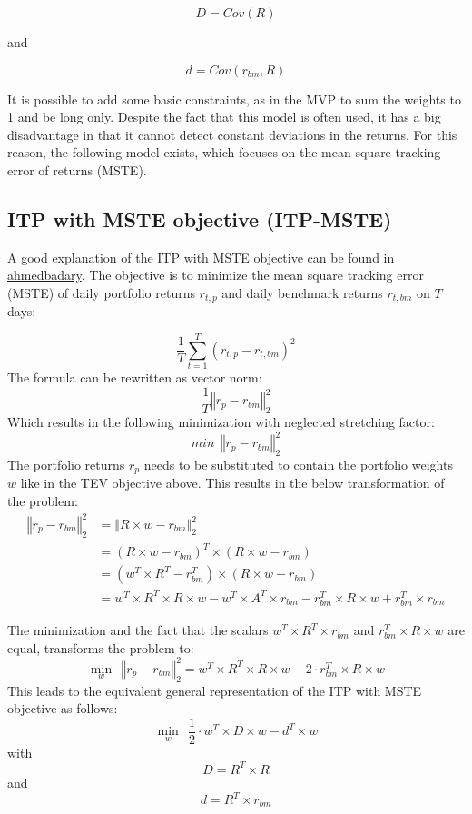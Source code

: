 \documentclass[
  oneside]{book}
\begin{document}
\[
  D = Cov(R)
\]

and

\[
d = Cov(r_{bm}, R)
\]

It is possible to add some basic constraints, as in the MVP to sum the weights to 1 and be long only. Despite the fact that this model is often used, it has a big disadvantage in that it cannot detect constant deviations in the returns. For this reason, the following model exists, which focuses on the mean square tracking error of returns (MSTE).

\hypertarget{itp-with-mste-objective-itp-mste}{%
\subsection{ITP with MSTE objective (ITP-MSTE)}\label{itp-with-mste-objective-itp-mste}}

A good explanation of the ITP with MSTE objective can be found in \href{https://ahmedbadary.github.io/work_files/research/conv_opt/hw/iftp}{ahmedbadary}. The objective is to minimize the mean square tracking error (MSTE) of daily portfolio returns \(r_{t, p}\) and daily benchmark returns \(r_{t, bm}\) on \(T\) days:

\[
  \frac{1}{T} \sum^T_{t=1}(r_{t, p}-r_{t, bm})^2
\]
The formula can be rewritten as vector norm:
\[
  \frac{1}{T} \left\Vert r_{p}-r_{bm} \right\Vert_2^2
\]
Which results in the following minimization with neglected stretching factor:
\[
 min \ \  \left\Vert r_{p}-r_{bm} \right\Vert_2^2
\]
The portfolio returns \(r_p\) needs to be substituted to contain the portfolio weights \(w\) like in the TEV objective above. This results in the below transformation of the problem:
\begin{align*}
  \left\Vert r_{p}-r_{bm} \right\Vert_2^2 &= \left\Vert R \times w-r_{bm} \right\Vert_2^2 \\ 
  &= (R \times w-r_{bm})^T \times (R \times w-r_{bm}) \\ 
  &= (w^T \times R^T-r_{bm}^T) \times (R \times w-r_{bm}) \\ 
  &= w^T \times R^T \times R \times w - w^T \times A^T \times r_{bm} - r_{bm}^T \times R \times w + r_{bm}^T \times r_{bm} 
\end{align*}

The minimization and the fact that the scalars \(w^T \times R^T \times r_{bm}\) and \(r_{bm}^T \times R \times w\) are equal, transforms the problem to:
\[
  \min\limits_{w} \ \  \left\Vert r_{p}-r_{bm} \right\Vert_2^2 
  = w^T \times R^T \times R \times w - 2\cdot r_{bm}^T \times R \times w
\]
This leads to the equivalent general representation of the ITP with MSTE objective as follows:
\[
  \min\limits_{w} \ \ \frac{1}{2} \cdot w^T \times D \times w - d^T \times w
\]
with
\[
D = R^T \times R
\]
and
\[
  d = R^T \times r_{bm}
\]
\end{document}
